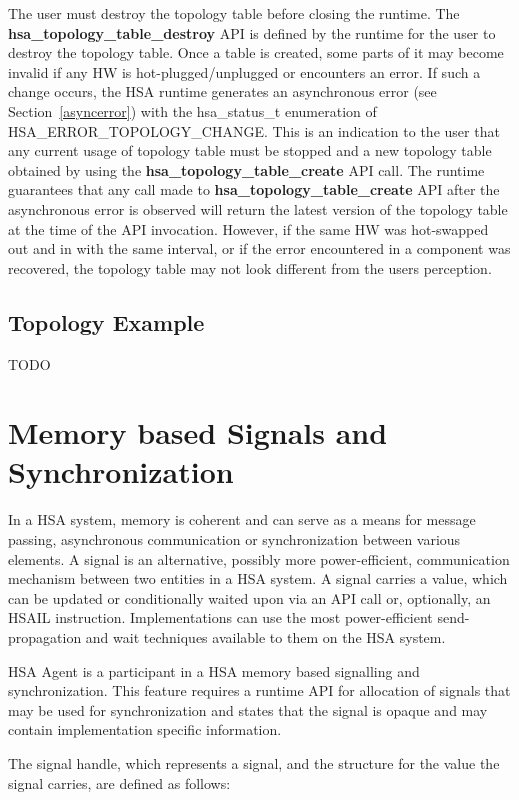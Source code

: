 \documentclass{book}
\newcommand{\reffun}[1]{\textbf{#1}}
\newcommand{\reftyp}[1]{#1}
\newcommand{\refenu}[1]{\reftyp{#1}}
\begin{document}
The user must destroy the topology table before closing the runtime.
The \reffun{hsa\_topology\_table\_destroy} API is defined by the
runtime for the user to destroy the topology table. Once a table is
created, some parts of it may become invalid if any HW is
hot-plugged/unplugged or encounters an error. If such a change
occurs, the HSA runtime generates an asynchronous error (see
Section~\ref{asyncerror}) with the \reftyp{hsa\_status\_t} enumeration
of \refenu{HSA\_ERROR\_TOPOLOGY\_CHANGE}. This is an indication to the
user that any current usage of topology table must be stopped and a
new topology table obtained by using the
\reffun{hsa\_topology\_table\_create} API call. The runtime guarantees
that any call made to \reffun{hsa\_topology\_table\_create} API after
the asynchronous error is observed will return the latest version of
the topology table at the time of the API invocation. However, if
the same HW was hot-swapped out and in with the same interval, or if
the error encountered in a component was recovered, the topology
table may not look different from the users perception.

\hypertarget{topology_example}{} \subsection{Topology Example}
TODO

\hypertarget{signals}{}\section{Memory based Signals and
Synchronization}\label{signals}

In a HSA system, memory is coherent and can serve as a means for
message passing, asynchronous communication or synchronization
between various elements.  A signal is an alternative, possibly more
power-efficient, communication mechanism between two entities in a
HSA system. A signal carries a value, which can be updated or
conditionally waited upon via an API call or, optionally, an HSAIL
instruction. Implementations can use the most power-efficient send-propagation
and wait techniques available to them on the  HSA system.

HSA Agent is a participant in a HSA memory based signalling and
synchronization.  This feature requires a runtime API for allocation
of signals that may be used for synchronization and states that the
signal is opaque and may contain implementation specific information.

The signal handle, which represents a signal, and the structure for
the value the signal carries, are defined as follows:
\end{document}
